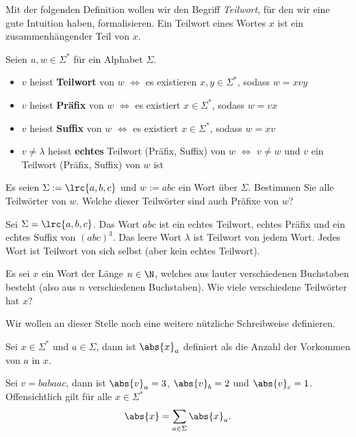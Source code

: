 Mit der folgenden Definition wollen wir den Begriff \textit{Teilwort}, für den wir eine gute Intuition haben, formalisieren. Ein Teilwort eines Wortes $x$ ist ein zusammenhängender Teil von $x$.
\begin{mydefinition}[Teilwörter]\label{mydefinition:Teilwort}
Seien $u,w\in\Sigma^*$ für ein Alphabet $\Sigma$.
\begin{itemize}
	\item $v$ heisst \textbf{Teilwort} von $w$ $\Leftrightarrow$ es existieren $x,y\in\Sigma^*$, sodass $w = xvy$
	\item $v$ heisst \textbf{Präfix} von $w$ $\Leftrightarrow$ es existiert $x\in\Sigma^*$, sodass $w = vx$
	\item $v$ heisst \textbf{Suffix} von $w$ $\Leftrightarrow$ es existiert $x\in\Sigma^*$, sodass $w = xv$
	\item $v\neq \lambda$ heisst \textbf{echtes} Teilwort (Präfix, Suffix) von $w$ $\Leftrightarrow$ $v\neq w$ und $v$ ein Teilwort (Präfix, Suffix) von $w$ ist
\end{itemize}
\end{mydefinition}

\begin{myexercise}\label{myexercise:0299}
	Es seien $\Sigma := \lrc{a,b,c}$ und $w := abc$ ein Wort über $\Sigma$. Bestimmen Sie alle Teilwörter von $w$. Welche dieser Teilwörter sind auch Präfixe von $w$?
\end{myexercise}

\begin{myexample}
Sei $\Sigma = \lrc{a,b,c}$. Das Wort $abc$ ist ein echtes Teilwort, echtes Präfix und ein echtes Suffix von $(abc)^3$. Das leere Wort $\lambda$ ist Teilwort von jedem Wort. Jedes Wort ist Teilwort von sich selbst (aber kein echtes Teilwort).
\end{myexample}

\begin{mychallenge}\label{mychallenge:0207}
	Es sei $x$ ein Wort der Länge $n\in\N$, welches aus lauter verschiedenen Buchstaben besteht (also aus $n$ verschiedenen Buchstaben). Wie viele verschiedene Teilwörter hat $x$?
\end{mychallenge}

Wir wollen an dieser Stelle noch eine weitere nützliche Schreibweise definieren.

Sei $x\in\Sigma^*$ und $a\in\Sigma$, dann ist $\abs{x}_a$ definiert als die Anzahl der Vorkommen von $a$ in $x$.
\begin{myexample}
Sei $v = babaac$, dann ist $\abs{v}_a = 3$, $\abs{v}_b = 2$ und $\abs{v}_c = 1$. Offensichtlich gilt für alle $x\in\Sigma^*$
\begin{align*}
	\abs{x} = \sum_{a\in\Sigma}\abs{x}_a.
\end{align*}
\end{myexample}

